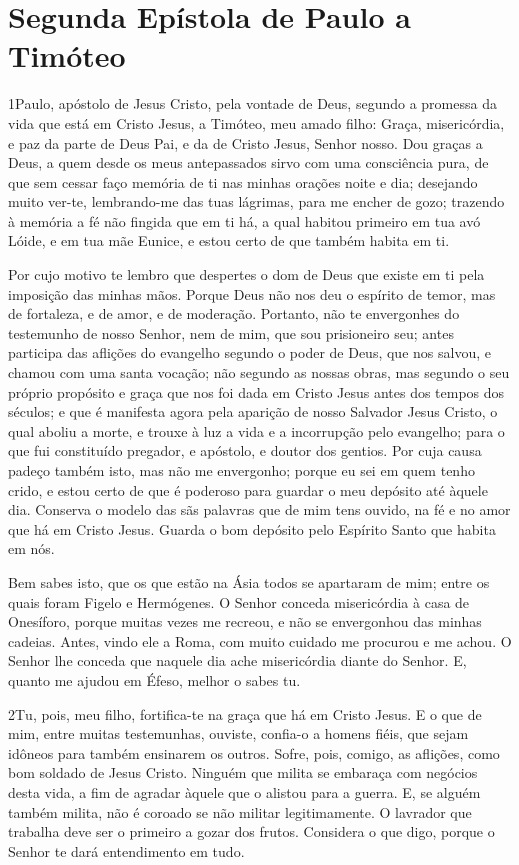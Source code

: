\thispagestyle{empty}
\chapter*{Segunda Epístola de Paulo a Timóteo}

\lettrine{1} Paulo, apóstolo de Jesus Cristo, pela vontade de
Deus, segundo a promessa da vida que está em Cristo Jesus, a
Timóteo, meu amado filho: Graça, misericórdia, e paz da parte de
Deus Pai, e da de Cristo Jesus, Senhor nosso. Dou graças a Deus,
a quem desde os meus antepassados sirvo com uma consciência pura, de
que sem cessar faço memória de ti nas minhas orações noite e dia;
desejando muito ver-te, lembrando-me das tuas lágrimas, para me
encher de gozo; trazendo à memória a fé não fingida que em ti
há, a qual habitou primeiro em tua avó Lóide, e em tua mãe Eunice, e
estou certo de que também habita em ti.

Por cujo motivo te lembro que despertes o dom de Deus que existe
em ti pela imposição das minhas mãos. Porque Deus não nos deu o
espírito de temor, mas de fortaleza, e de amor, e de moderação.
Portanto, não te envergonhes do testemunho de nosso Senhor, nem
de mim, que sou prisioneiro seu; antes participa das aflições do
evangelho segundo o poder de Deus, que nos salvou, e chamou com
uma santa vocação; não segundo as nossas obras, mas segundo o seu
próprio propósito e graça que nos foi dada em Cristo Jesus antes dos
tempos dos séculos; e que é manifesta agora pela aparição de
nosso Salvador Jesus Cristo, o qual aboliu a morte, e trouxe à luz a
vida e a incorrupção pelo evangelho; para o que fui
constituído pregador, e apóstolo, e doutor dos gentios. Por
cuja causa padeço também isto, mas não me envergonho; porque eu sei
em quem tenho crido, e estou certo de que é poderoso para guardar o
meu depósito até àquele dia. Conserva o modelo das sãs
palavras que de mim tens ouvido, na fé e no amor que há em Cristo
Jesus. Guarda o bom depósito pelo Espírito Santo que habita
em nós.

Bem sabes isto, que os que estão na Ásia todos se apartaram de
mim; entre os quais foram Figelo e Hermógenes. O Senhor
conceda misericórdia à casa de Onesíforo, porque muitas vezes me
recreou, e não se envergonhou das minhas cadeias. Antes,
vindo ele a Roma, com muito cuidado me procurou e me achou. O
Senhor lhe conceda que naquele dia ache misericórdia diante do
Senhor. E, quanto me ajudou em Éfeso, melhor o sabes tu.

\medskip

\lettrine{2} Tu, pois, meu filho, fortifica-te na graça que há
em Cristo Jesus. E o que de mim, entre muitas testemunhas,
ouviste, confia-o a homens fiéis, que sejam idôneos para também
ensinarem os outros. Sofre, pois, comigo, as aflições, como bom
soldado de Jesus Cristo. Ninguém que milita se embaraça com
negócios desta vida, a fim de agradar àquele que o alistou para a
guerra. E, se alguém também milita, não é coroado se não militar
legitimamente. O lavrador que trabalha deve ser o primeiro a
gozar dos frutos. Considera o que digo, porque o Senhor te dará
entendimento em tudo.

